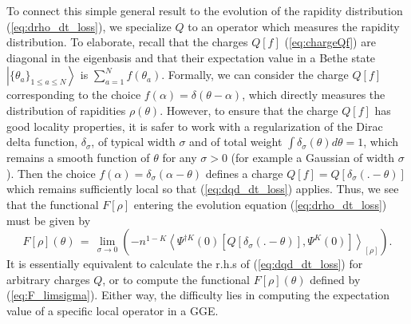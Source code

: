 \documentclass[onecolumn,amsfonts,showpacs,superscriptaddress]{revtex4-1}
\begin{document}
\vspace{0.5cm}

To connect this simple general result to the evolution of the rapidity distribution (\ref{eq:drho_dt_loss}), we specialize $Q$ to an operator which measures the rapidity distribution. To elaborate, recall that the charges $Q[f]$ (\ref{eq:chargeQf}) are diagonal in the eigenbasis and that their expectation value in a Bethe state $\left| \{ \theta_a\}_{1\leq a \leq N} \right>$ is $\sum_{a=1}^N f(\theta_a)$. Formally, we can consider the charge $Q[f]$ corresponding to the choice $f(\alpha) = \delta(\theta-\alpha)$, which directly measures the distribution of rapidities $\rho(\theta)$. However, to ensure that the charge $Q[f]$ has good locality properties, it is safer to work with a regularization of the Dirac delta function, $\delta_\sigma$, of typical width $\sigma$ and of total weight $\int \delta_\sigma(\theta) d\theta = 1$, which remains a smooth function of $\theta$ for any $\sigma>0$ (for example a Gaussian of width $\sigma$). Then the choice $f(\alpha) = \delta_\sigma (\alpha-\theta)$ defines a charge $Q[f] = Q[\delta_\sigma(.-\theta)]$ which remains sufficiently local so that (\ref{eq:dqd_dt_loss}) applies. Thus, we see that the functional $F[\rho]$ entering the evolution equation (\ref{eq:drho_dt_loss}) must be given by
\begin{equation}
    \label{eq:F_limsigma}
    F[\rho](\theta) \, = \, \lim_{\sigma \rightarrow 0} \left( - n^{1-K} \left< \Psi^{\dagger K}(0) [Q[\delta_\sigma (.-\theta)], \Psi^K(0)] \right>_{[\rho]} \right) .
\end{equation}
It is essentially equivalent to calculate the r.h.s of (\ref{eq:dqd_dt_loss}) for arbitrary charges $Q$, or to compute the functional $F[\rho](\theta)$ defined by (\ref{eq:F_limsigma}). Either way, the difficulty lies in computing the expectation value of a specific local operator in a GGE.
\end{document}
